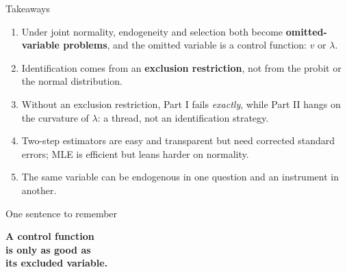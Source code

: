 \documentclass[aspectratio=169,11pt]{beamer}
\newcommand{\Mills}{\lambda}
\begin{document}
\begin{frame}{Takeaways}

\begin{enumerate}
  \item
  Under joint normality, endogeneity and selection both become
  \textbf{omitted-variable problems}, and the omitted variable is a
  control function: $v$ or $\Mills$.

  \vspace{0.25em}

  \item
  Identification comes from an \textbf{exclusion restriction}, not from
  the probit or the normal distribution.

  \vspace{0.25em}

  \item
  Without an exclusion restriction, Part I fails \emph{exactly}, while
  Part II hangs on the curvature of $\Mills$: a thread, not an
  identification strategy.

  \vspace{0.25em}

  \item
  Two-step estimators are easy and transparent but need corrected
  standard errors; MLE is efficient but leans harder on normality.

  \vspace{0.25em}

  \item
  The same variable can be endogenous in one question and an instrument
  in another.
\end{enumerate}

\end{frame}

\begin{frame}{One sentence to remember}

\begin{center}

\vspace{0.6em}

\Huge
\textbf{
A control function
\\[0.3em]
is only as good as
\\[0.3em]
its excluded variable.
}

\end{center}

\end{frame}
\end{document}
